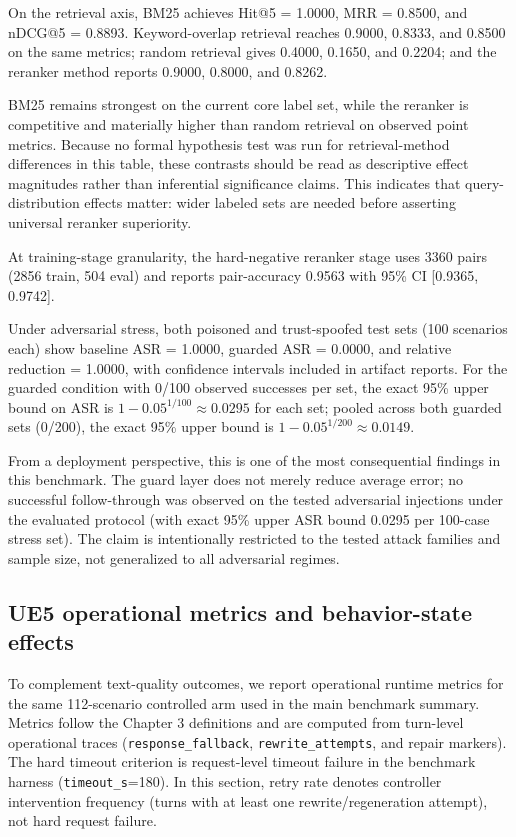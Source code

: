 ﻿\documentclass[a4paper,12pt]{article}
\begin{document}
On the retrieval axis, BM25 achieves Hit@5 = 1.0000, MRR = 0.8500, and nDCG@5 = 0.8893. Keyword-overlap retrieval reaches 0.9000, 0.8333, and 0.8500 on the same metrics; random retrieval gives 0.4000, 0.1650, and 0.2204; and the reranker method reports 0.9000, 0.8000, and 0.8262.

BM25 remains strongest on the current core label set, while the reranker is competitive and materially higher than random retrieval on observed point metrics. Because no formal hypothesis test was run for retrieval-method differences in this table, these contrasts should be read as descriptive effect magnitudes rather than inferential significance claims. This indicates that query-distribution effects matter: wider labeled sets are needed before asserting universal reranker superiority.

At training-stage granularity, the hard-negative reranker stage uses 3360 pairs (2856 train, 504 eval) and reports pair-accuracy 0.9563 with 95\% CI [0.9365, 0.9742].

Under adversarial stress, both poisoned and trust-spoofed test sets (100 scenarios each) show baseline ASR = 1.0000, guarded ASR = 0.0000, and relative reduction = 1.0000, with confidence intervals included in artifact reports. For the guarded condition with 0/100 observed successes per set, the exact 95\% upper bound on ASR is \(1-0.05^{1/100}\approx 0.0295\) for each set; pooled across both guarded sets (0/200), the exact 95\% upper bound is \(1-0.05^{1/200}\approx 0.0149\).

From a deployment perspective, this is one of the most consequential findings in this benchmark. The guard layer does not merely reduce average error; no successful follow-through was observed on the tested adversarial injections under the evaluated protocol (with exact 95\% upper ASR bound 0.0295 per 100-case stress set). The claim is intentionally restricted to the tested attack families and sample size, not generalized to all adversarial regimes.

\subsection{UE5 operational metrics and behavior-state effects}
To complement text-quality outcomes, we report operational runtime metrics for the same 112-scenario controlled arm used in the main benchmark summary. Metrics follow the Chapter 3 definitions and are computed from turn-level operational traces (\texttt{response\_fallback}, \texttt{rewrite\_attempts}, and repair markers). The hard timeout criterion is request-level timeout failure in the benchmark harness (\texttt{timeout\_s}=180). In this section, retry rate denotes controller intervention frequency (turns with at least one rewrite/regeneration attempt), not hard request failure.
\end{document}
